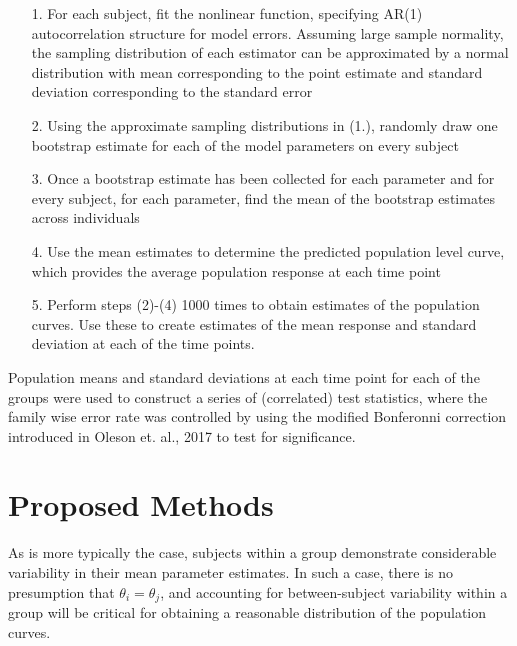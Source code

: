 \documentclass{article}
\begin{document}
\begin{enumerate}
\vspace{-3mm}
\item[1.] For each subject, fit the nonlinear function, specifying AR(1) autocorrelation structure for model errors. Assuming large sample normality, the sampling distribution of each estimator can be approximated by a normal distribution with mean corresponding to the point estimate and standard deviation corresponding to the standard error

\item[2.] Using the approximate sampling distributions in (1.), randomly draw one bootstrap estimate for each of the model parameters on every subject

\item[3.] Once a bootstrap estimate has been collected for each parameter and for every subject, for each parameter, find the mean of the bootstrap estimates across individuals

\item[4.] Use the mean estimates to determine the predicted population level curve, which provides the average population response at each time point

\item[5.] Perform steps (2)-(4) 1000 times to obtain estimates of the population curves. Use these to create estimates of the mean response and standard deviation at each of the time points. 
\end{enumerate}

Population means and standard deviations at each time point for each of the groups were used to construct a series of (correlated) test statistics, where the family wise error rate was controlled by using the modified Bonferonni correction introduced in Oleson et. al.,  2017 to test for significance.


\section{Proposed Methods}

As is more typically the case, subjects within a group demonstrate considerable variability in their mean parameter estimates. In such a case, there is no presumption that $\theta_i = \theta_j$, and accounting for between-subject variability within a group will be critical for obtaining a reasonable distribution of the population curves.
\end{document}

